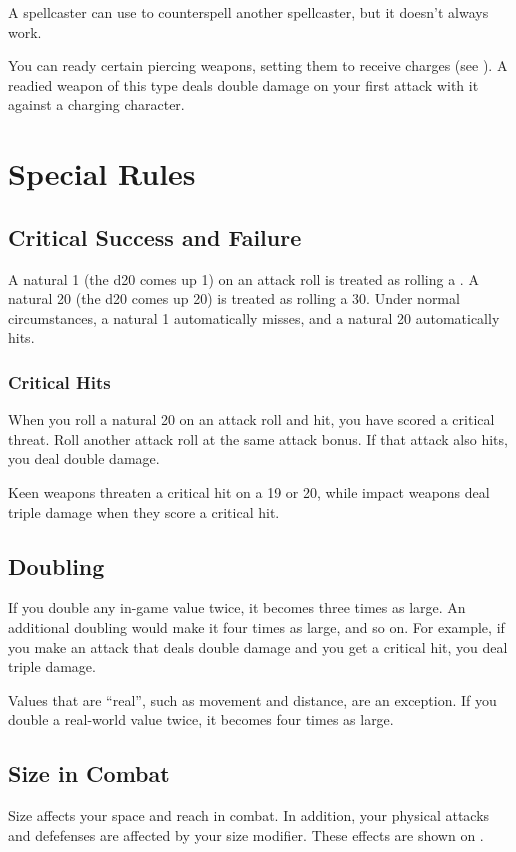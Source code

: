 A spellcaster can use  to counterspell another spellcaster, but it doesn't always work.

 You can ready certain piercing weapons, setting them to receive charges (see ). A readied weapon of this type deals double damage on your first attack with it against a charging character.

\section{Special Rules}\label{Special Rules}

\subsection{Critical Success and Failure}\label{Critical Success and Failure}
A natural 1 (the d20 comes up 1) on an attack roll is treated as rolling a . A natural 20 (the d20 comes up 20) is treated as rolling a 30. Under normal circumstances, a natural 1 automatically misses, and a natural 20 automatically hits.

\subsubsection{Critical Hits}\label{Critical Hits}
When you roll a natural 20 on an attack roll and hit, you have scored a critical threat. Roll another attack roll at the same attack bonus. If that attack also hits, you deal double damage.

Keen weapons threaten a critical hit on a 19 or 20, while impact weapons deal triple damage when they score a critical hit.

\subsection{Doubling}\label{Doubling}
If you double any in-game value twice, it becomes three times as large. An additional doubling would make it four times as large, and so on. For example, if you make an attack that deals double damage and you get a critical hit, you deal triple damage.

 Values that are ``real'', such as movement and distance, are an exception. If you double a real-world value twice, it becomes four times as large. 

\subsection{Size in Combat}\label{Size in Combat}
Size affects your space and reach in combat. In addition, your physical attacks and defefenses are affected by your size modifier. These effects are shown on . 


